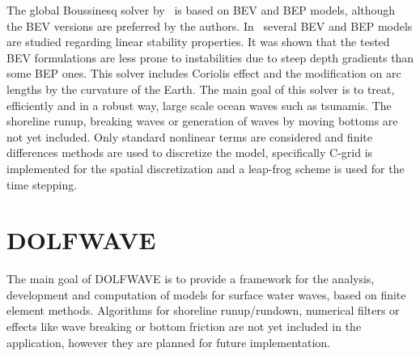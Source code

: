 The global Boussinesq solver by~\cite{PedersenLovholt2008}
is based on BEV and BEP models, although the BEV versions
are preferred by the authors.  In~\cite{LovholtPedersen2009}
several BEV and BEP models are
studied regarding linear stability properties.  It was shown
that the tested BEV formulations are less prone to
instabilities due to steep depth gradients than some BEP
ones.  This solver includes Coriolis effect and the
modification on arc lengths by the curvature of the
Earth. The main goal of this solver is to treat, efficiently
and in a robust way, large scale ocean waves such as
tsunamis.  The shoreline runup, breaking waves or generation
of waves by moving bottoms are not yet included.  Only
standard nonlinear terms are considered and finite
differences methods are used to discretize the model,
specifically C-grid is implemented for the spatial discretization and a
leap-frog scheme is used for the time stepping.

\section{DOLFWAVE}\label{sec:lopes:dolfwave}
The main goal of DOLFWAVE is to provide a framework for the
analysis, development and computation of models for surface
water waves, based on finite element methods. Algorithms
for shoreline runup/rundown, numerical filters or effects
like wave breaking or bottom friction are not yet included
in the application, however they are planned for future
implementation.

